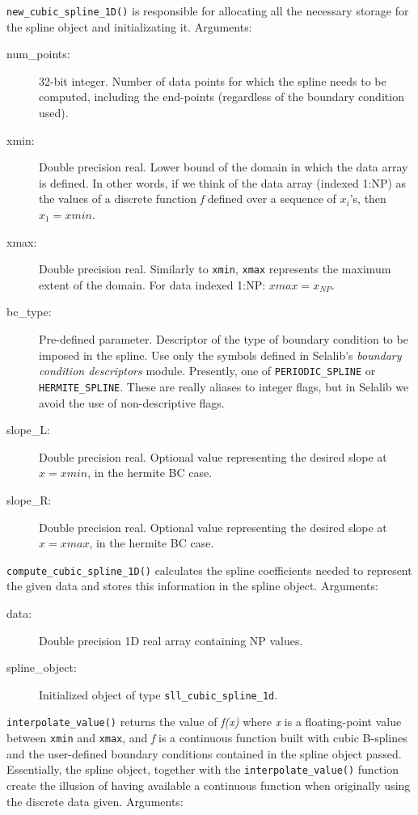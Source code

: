 \documentclass[]{report}   %
\begin{document}
\begin{description}
	\item \verb+new_cubic_spline_1D()+ is responsible for allocating all the necessary storage for the spline object and initializating it. Arguments:

	\begin{description}
		\item[num\_points:] 
32-bit integer. Number of data points for which the spline needs to be computed, including the end-points (regardless of the boundary condition used).
		\item[xmin:]
Double precision real. Lower bound of the domain in which the data array is defined. In other words, if we think of the data array (indexed 1:NP) as the values of a discrete function \emph{f} defined over a sequence of $x_i$'s, then $x_1 = xmin$.
		\item[xmax:]
Double precision real. Similarly to \verb+xmin+, \verb+xmax+ represents the maximum extent of the domain. For data indexed 1:NP: $xmax = x_{NP}$. 
		\item[bc\_type:]
Pre-defined parameter. Descriptor of the type of boundary condition to be imposed in the spline. Use only the symbols defined in Selalib's \emph{boundary condition descriptors} module. Presently, one of \verb+PERIODIC_SPLINE+ or \verb+HERMITE_SPLINE+. These are really aliases to integer flags, but in Selalib we avoid the use of non-descriptive flags.
		\item[slope\_L:]
	Double precision real. Optional value representing the desired slope at $x = xmin$, in the hermite BC case.
		\item[slope\_R:]
	Double precision real. Optional value representing the desired slope at $x = xmax$, in the hermite BC case.
	\end{description}


	\item \verb+compute_cubic_spline_1D()+ calculates the spline coefficients needed to represent the given data and stores this information in the spline object. Arguments:
	
	\begin{description}
		\item[ data:] Double precision 1D real array containing NP values.
		\item[ spline\_object: ] Initialized object of type \verb+sll_cubic_spline_1d+.
	\end{description}


	\item \verb+interpolate_value()+ returns the value of \emph{f(x)} where \emph{x} is a floating-point value between \verb+xmin+ and \verb+xmax+, and \emph{f} is a continuous function built with cubic B-splines and the user-defined boundary conditions contained in the spline object passed. Essentially, the spline object, together with the \verb+interpolate_value()+ function create the illusion of having available a continuous function when originally using the discrete data given. Arguments:
	

\end{description}
\end{document}
